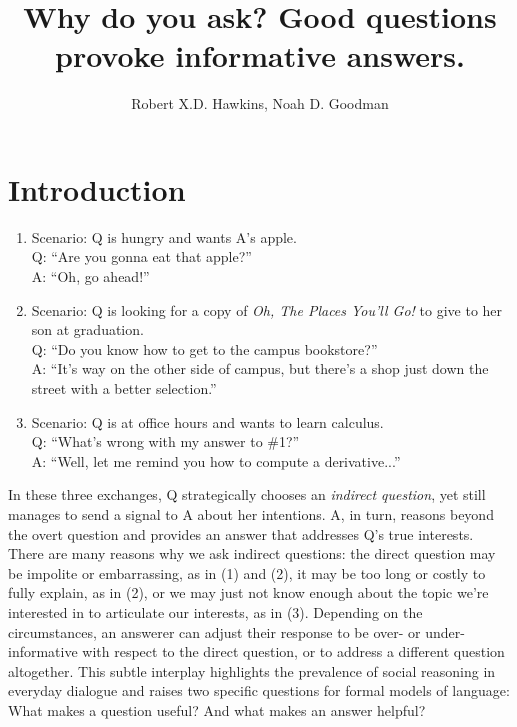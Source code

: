 \documentclass[12pt, floatsintext, jou]{apa6}
\title{Why do you ask? Good questions provoke informative answers.}
\author{Robert X.D. Hawkins, Noah D. Goodman}
\affiliation{Stanford University}
\begin{document}
\maketitle
\section{Introduction}

\begin{enumerate}[(1)]
\item Scenario: Q is hungry and wants A's apple.\\Q: ``Are you gonna eat that apple?''\\ A: ``Oh, go ahead!''
\item Scenario: Q is looking for a copy of \emph{Oh, The Places You'll Go!} to give to her son at graduation.\\ Q: ``Do you know how to get to the campus bookstore?''\\ A: ``It's way on the other side of campus, but there's a shop just down the street with a better selection.''
\item Scenario: Q is at office hours and wants to learn calculus.\\ Q: ``What's wrong with my answer to \#1?''\\ A: ``Well, let me remind you how to compute a derivative...''
\end{enumerate}

In these three exchanges, Q strategically chooses an \emph{indirect question}, yet still manages to send a signal to A about her intentions. 
A, in turn, reasons beyond the overt question and provides an answer that addresses Q's true interests. 
There are many reasons why we ask indirect questions: the direct question may be impolite or embarrassing, as in (1) and (2), it may be too long or costly to fully explain, as in (2), or we may just not know enough about the topic we're interested in to articulate our interests, as in (3). 
Depending on the circumstances, an answerer can adjust their response to be over- or under-informative with respect to the direct question, or to address a different question altogether. This subtle interplay highlights the prevalence of social reasoning in everyday dialogue and raises two specific questions for formal models of language: What makes a question useful? And what makes an answer helpful? 
\end{document}
